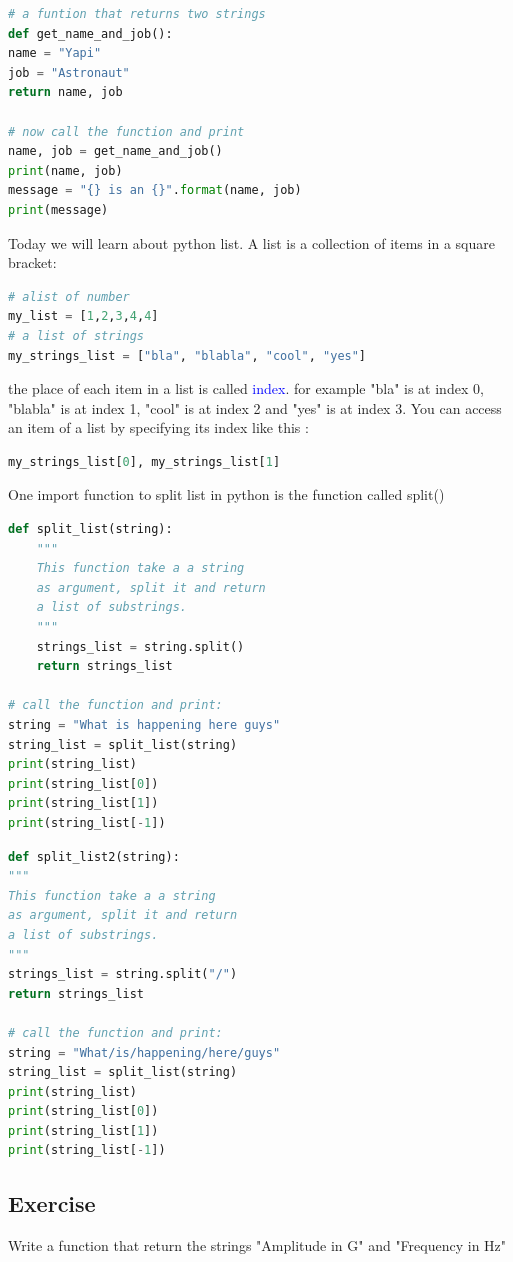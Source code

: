 \documentclass[10pt,a4paper,titlepage]{article}
\begin{document}
\begin{lstlisting}[language=python]
# a funtion that returns two strings
def get_name_and_job():
name = "Yapi"
job = "Astronaut"
return name, job

# now call the function and print
name, job = get_name_and_job()
print(name, job)
message = "{} is an {}".format(name, job)
print(message)
\end{lstlisting}
Today we will learn about  python list. A list is a collection of items in a square bracket:
\begin{lstlisting}[language=python]
# alist of number
my_list = [1,2,3,4,4]
# a list of strings
my_strings_list = ["bla", "blabla", "cool", "yes"]
\end{lstlisting}
the place of each item in a list is called \textcolor{blue}{index}. for example "bla" is at index 0, "blabla" is at index 1, "cool" is at index 2 and "yes" is at index 3. You can access an item of a list by specifying its index like this :
\begin{lstlisting}[language=python]
my_strings_list[0], my_strings_list[1]
\end{lstlisting}
One import function to split list in python is the function called split()
\begin{lstlisting}[language=python]
def split_list(string):
	"""
	This function take a a string 
	as argument, split it and return 
	a list of substrings.
	"""
	strings_list = string.split()
	return strings_list

# call the function and print:
string = "What is happening here guys"
string_list = split_list(string)
print(string_list)
print(string_list[0])
print(string_list[1])
print(string_list[-1])
\end{lstlisting}

\begin{lstlisting}[language=python]
def split_list2(string):
"""
This function take a a string 
as argument, split it and return 
a list of substrings.
"""
strings_list = string.split("/")
return strings_list

# call the function and print:
string = "What/is/happening/here/guys"
string_list = split_list(string)
print(string_list)
print(string_list[0])
print(string_list[1])
print(string_list[-1])
\end{lstlisting}
\subsection{Exercise}
Write a function that return the strings "Amplitude in G" and "Frequency in Hz"
\end{document}
